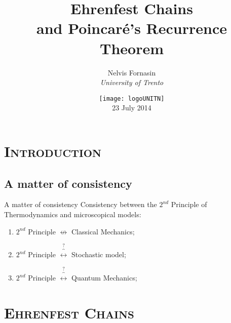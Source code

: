\documentclass[xcolor=x11names, compress]{beamer}
\renewcommand{\(}{\begin{columns}}
\renewcommand{\)}{\end{columns}}
\newcommand{\<}[1]{\begin{column}{#1}}
\renewcommand{\>}{\end{column}}
\theoremstyle{definition}
\theoremstyle{plain}
\begin{document}
\begin{frame}
\title{Ehrenfest Chains \\and Poincar\'e's Recurrence Theorem}
\author{
	Nelvis Fornasin\\
	{\it University of Trento}\\
}
\date{
	\texttt{[image: logoUNITN]}
	\\
	\vspace{1cm}
	23 July 2014
}
\titlepage
\end{frame}

\begin{frame}
\tableofcontents
\end{frame}

\section{\scshape Introduction}
\subsection{A matter of consistency}
\begin{frame}{A matter of consistency}
\large{Consistency between the $2^{nd}$ Principle of Thermodynamics and microscopical models:\\}
\begin{enumerate}
\item<1->$2^{nd}$ Principle $\nleftrightarrow$ Classical Mechanics;
\item<2->$2^{nd}$ Principle $\overbrace{\longleftrightarrow}^{?}$ Stochastic model;
\item<2->$2^{nd}$ Principle $\overbrace{\longleftrightarrow}^{?}$ Quantum Mechanics;
\end{enumerate}
\end{frame}

\section{\scshape Ehrenfest Chains}
\end{document}
